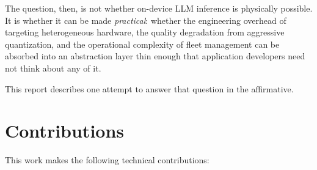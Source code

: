 \documentclass[12pt, letterpaper, twoside]{report}
\begin{document}
The question, then, is not whether on-device LLM inference is physically possible. It is whether it can be made \textit{practical}: whether the engineering overhead of targeting heterogeneous hardware, the quality degradation from aggressive quantization, and the operational complexity of fleet management can be absorbed into an abstraction layer thin enough that application developers need not think about any of it.

This report describes one attempt to answer that question in the affirmative.

\section{Contributions}
\label{sec:contributions}

This work makes the following technical contributions:
\end{document}

